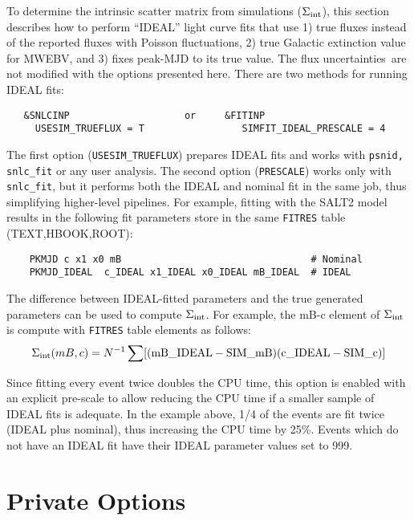 \documentclass[12pt]{article}
\newcommand{\uncs}{uncertainties}
\begin{document}
\newcommand{\SigInt}{\Sigma_{\rm int}}

To determine the intrinsic scatter matrix from simulations ($\SigInt$),
this section describes how to perform ``IDEAL'' light curve fits that
use 
1) true fluxes instead of the reported fluxes with Poisson 
fluctuations, 
2) true Galactic extinction value for MWEBV, and
3) fixes peak-MJD to its true value.
The flux \uncs\ are not modified with the options presented here.
There are two methods for running IDEAL fits:
%
\begin{verbatim}
   &SNLCINP                    or     &FITINP
     USESIM_TRUEFLUX = T                 SIMFIT_IDEAL_PRESCALE = 4 
\end{verbatim}
%
The first option ({\tt USESIM\_TRUEFLUX}) prepares IDEAL fits
and works with {\tt psnid, snlc\_fit} or any user analysis.
The second option ({\tt PRESCALE}) works only with {\tt snlc\_fit},
but it performs both the IDEAL and nominal fit in the
same job, thus simplifying higher-level pipelines.
For example, fitting with the SALT2 model results
in the following fit parameters store in the same
{\tt FITRES} table (TEXT,HBOOK,ROOT):
\begin{verbatim}
    PKMJD c x1 x0 mB                                 # Nominal
    PKMJD_IDEAL  c_IDEAL x1_IDEAL x0_IDEAL mB_IDEAL  # IDEAL
\end{verbatim}
%

The difference between IDEAL-fitted parameters and the true generated 
parameters can be used to compute $\SigInt$. For example, 
the mB-c element of $\SigInt$ is compute with {\tt FITRES} table
elements as follows:
%
  $$ \SigInt(mB,c) = 
      N^{-1}\sum[{\rm (mB\_IDEAL-SIM\_mB)(c\_IDEAL-SIM\_c)}]
   $$

Since fitting every event twice doubles the CPU time, 
this option is enabled with an explicit pre-scale
to allow reducing the CPU time if a smaller sample
of IDEAL fits is adequate. In the example above,
1/4 of the events are fit twice (IDEAL plus nominal),
thus increasing the CPU time by 25\%. 
Events which do not have an IDEAL fit have their
IDEAL parameter values set to 999.


  \clearpage
  \section{Private Options}
  \label{sec:private}
\end{document}

